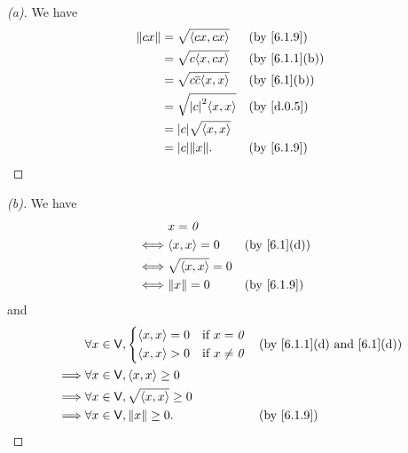 \begin{proof}[(a)]
	We have
	\begin{align*}
		\norm{cx} & = \sqrt{\inn{cx, cx}}          &  & \by{6.1.9}    \\
		          & = \sqrt{c \inn{x, cx}}         &  & \by{6.1.1}[b] \\
		          & = \sqrt{c \conj{c} \inn{x, x}} &  & \by{6.1}[b]   \\
		          & = \sqrt{\abs{c}^2 \inn{x, x}}  &  & \by{d.0.5}    \\
		          & = \abs{c} \sqrt{\inn{x, x}}                       \\
		          & = \abs{c} \norm{x}.            &  & \by{6.1.9}
	\end{align*}
\end{proof}

\begin{proof}[(b)]
	We have
	\begin{align*}
		     & x = \zv                                \\
		\iff & \inn{x, x} = 0        &  & \by{6.1}[d] \\
		\iff & \sqrt{\inn{x, x}} = 0                  \\
		\iff & \norm{x} = 0          &  & \by{6.1.9}
	\end{align*}
	and
	\begin{align*}
		         & \forall x \in \V, \begin{dcases}
			                             \inn{x, x} = 0 & \text{if } x = \zv    \\
			                             \inn{x, x} > 0 & \text{if } x \neq \zv
		                             \end{dcases}  &  & \text{(by \cref{6.1.1}(d) and \cref{6.1}(d))} \\
		\implies & \forall x \in \V, \inn{x, x} \geq 0                                                \\
		\implies & \forall x \in \V, \sqrt{\inn{x, x}} \geq 0                                         \\
		\implies & \forall x \in \V, \norm{x} \geq 0.         &  & \by{6.1.9}
	\end{align*}
\end{proof}

